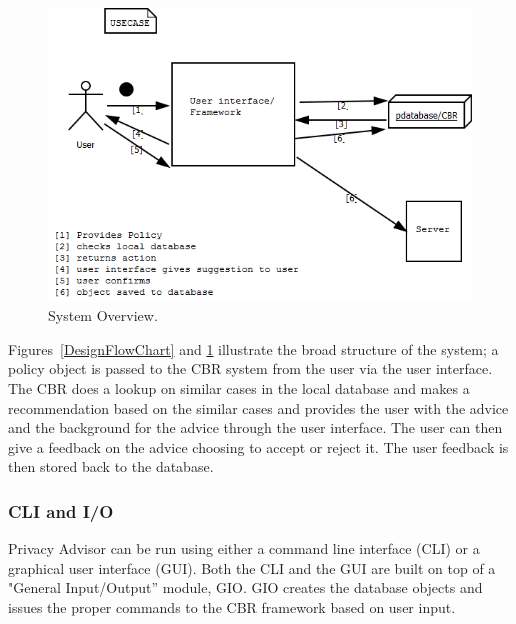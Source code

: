 \begin{figure}[htbp]
\begin{center}
\includegraphics[width = \textwidth]{DesignReport/uml/Case.png}
\caption{System Overview.}
\label{SystemOverview}
\end{center}
\end{figure}

Figures~\ref{DesignFlowChart} and \ref{SystemOverview} illustrate the broad structure of the system; a policy object is passed to the CBR system from the user via the user interface. The CBR does a lookup on similar cases in the local database and makes a recommendation based on the similar cases and provides the user with the advice and the background for the advice through the user interface. The user can then give a feedback on the advice choosing to accept or reject it. The user feedback is then stored back to the database.

\subsubsection{CLI and I/O}
Privacy Advisor can be run using either a command line interface (CLI) or a graphical user interface (GUI). Both the CLI and the GUI are built on top of a "General Input/Output'' module, GIO. GIO creates the database objects and issues the proper commands to the CBR framework based on user input.


